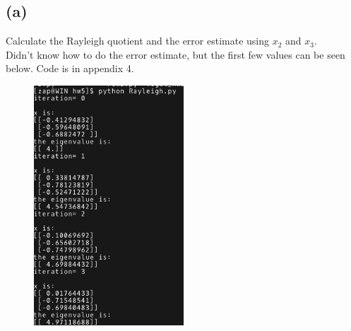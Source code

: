 \documentclass{article}
\begin{document}
\subsection*{(a)}
Calculate the Rayleigh quotient and the error estimate using $x_2$ and $x_3$.\\
Didn't know how to do the error estimate, but the first few values can be seen below. Code is in appendix 4.
\begin{figure}[H]
    \centering
    \includegraphics[width=0.5\textwidth]{p4a.png}
\end{figure}
\end{document}

